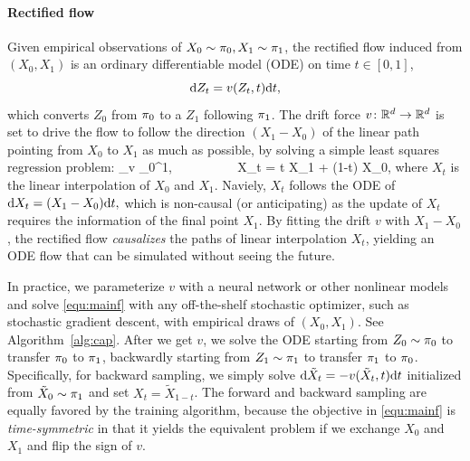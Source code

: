 \paragraph{Rectified flow}
Given empirical observations of $X_0\sim {\pi}_0, X_1\sim {\pi}_1$, 
the rectified flow induced from $(X_0,X_1)$ 
is an ordinary differentiable model (ODE)
on time $t\in[0,1]$, 
$$
\mathrm{d} Z_t = v(Z_t, t) \mathrm{d}t, 
$$
which converts $Z_0$ from ${\pi}_0$ to a $Z_1$ following ${\pi}_1$. 
The drift force 
 $v\colon \mathbb{R}^d\to \mathbb{R}^d$  is set to drive the flow to 
 follow the direction $(X_1-X_0)$ 
 of the linear path pointing from $X_0$ to $X_1$
 as much as possible, by solving a simple 
 least squares regression problem:  \bbb\label{equ:mainf}
\min_{v} %
\int_0^1\E {} \dt, 
~~~~~~~~~
X_t = t X_1 + (1-t) X_0, 
\eee 
where $X_t$ is 
the linear interpolation  of  $X_0$ and  $X_1$. 
Naviely, $X_t$ follows the ODE of $\mathrm{d}  X_t =(X_1-X_0)\mathrm{d}t,$ which is non-causal (or anticipating) as the update of $X_t$ requires the information of the final point $X_1$.  
By fitting the drift $v$ with $X_1-X_0$, 
the rectified flow \emph{causalizes}
the paths of linear interpolation $X_t$, 
yielding an ODE flow %
that can be simulated without seeing the future. %


 In practice, we parameterize $v$ with a neural network or other nonlinear models 
 and solve  
  \eqref{equ:mainf} %
  with any  off-the-shelf stochastic optimizer, such as stochastic gradient descent,  
  with empirical draws of $(X_0,X_1)$. See 
  Algorithm~\ref{alg:cap}. 
  After we get $v$, we solve the ODE starting from $Z_0 \sim {\pi}_0$ to transfer ${\pi}_0$ to ${\pi}_1$,
   backwardly starting from $Z_1\sim {\pi}_1$ to transfer ${\pi}_1$ to ${\pi}_0$. Specifically, 
  for  backward sampling, 
  we simply  
  solve $\mathrm{d} \tilde X_t = -v(\tilde X_t, t) \mathrm{d}t $ initialized from $\tilde X_0 \sim {\pi}_1$ and set 
   $X_t= \tilde X_{1-t}$. 
   The forward and backward sampling 
are equally favored by the training  algorithm, because  the objective  in \eqref{equ:mainf} is 
\emph{time-symmetric} 
in that it yields the equivalent problem if we exchange $X_0$ and $X_1$ and flip the sign of $v$. 



 





